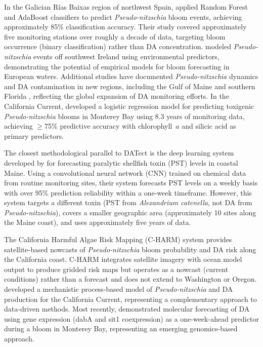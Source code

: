 \documentclass[preprint,12pt,authoryear]{elsarticle}
\begin{document}
In the Galician R\'ias Baixas region of northwest Spain, \citet{Alaez2021} applied Random Forest and AdaBoost classifiers to predict \textit{Pseudo-nitzschia} bloom events, achieving approximately 85\% classification accuracy. Their study covered approximately five monitoring stations over roughly a decade of data, targeting bloom occurrence (binary classification) rather than DA concentration. \citet{Cusack2015} modeled \textit{Pseudo-nitzschia} events off southwest Ireland using environmental predictors, demonstrating the potential of empirical models for bloom forecasting in European waters. Additional studies have documented \textit{Pseudo-nitzschia} dynamics and DA contamination in new regions, including the Gulf of Maine \citep{Clark2021} and southern Florida \citep{Schreiber2023}, reflecting the global expansion of DA monitoring efforts. In the California Current, \citet{Lane2009} developed a logistic regression model for predicting toxigenic \textit{Pseudo-nitzschia} blooms in Monterey Bay using 8.3 years of monitoring data, achieving $\geq$75\% predictive accuracy with chlorophyll~$a$ and silicic acid as primary predictors.

The closest methodological parallel to DATect is the deep learning system developed by \citet{Grasso2019} for forecasting paralytic shellfish toxin (PST) levels in coastal Maine. Using a convolutional neural network (CNN) trained on chemical data from routine monitoring sites, their system forecasts PST levels on a weekly basis with over 95\% prediction reliability within a one-week timeframe. However, this system targets a different toxin (PST from \textit{Alexandrium catenella}, not DA from \textit{Pseudo-nitzschia}), covers a smaller geographic area (approximately 10 sites along the Maine coast), and uses approximately five years of data.

The California Harmful Algae Risk Mapping (C-HARM) system \citep{Anderson2016} provides satellite-based nowcasts of \textit{Pseudo-nitzschia} bloom probability and DA risk along the California coast. C-HARM integrates satellite imagery with ocean model output to produce gridded risk maps but operates as a nowcast (current conditions) rather than a forecast and does not extend to Washington or Oregon. \citet{Moreno2022} developed a mechanistic process-based model of \textit{Pseudo-nitzschia} and DA production for the California Current, representing a complementary approach to data-driven methods. Most recently, \citet{Brunson2024} demonstrated molecular forecasting of DA using gene expression (dabA and sit1 coexpression) as a one-week-ahead predictor during a bloom in Monterey Bay, representing an emerging genomics-based approach.
\end{document}

